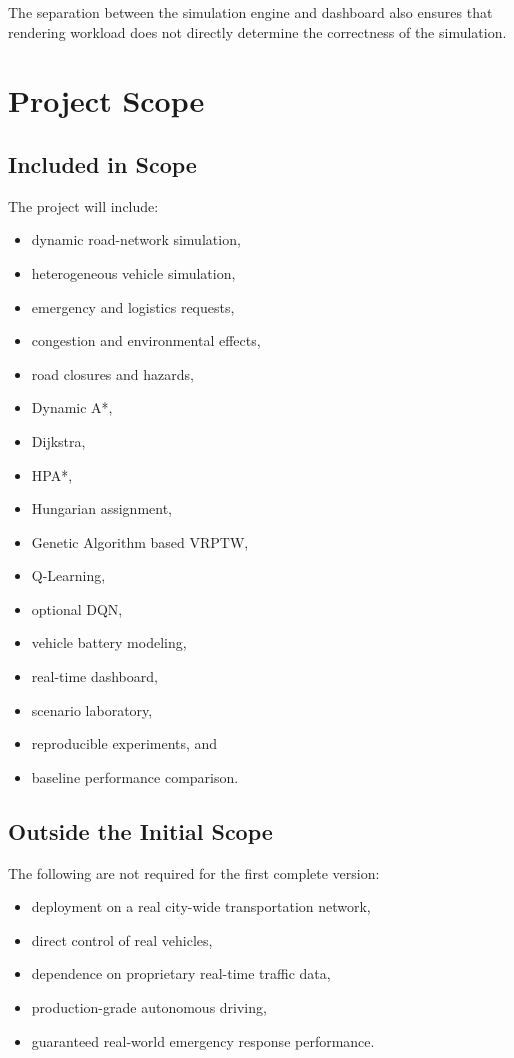 \documentclass[12pt,a4paper]{article}
\begin{document}
The separation between the simulation engine and dashboard also
ensures that rendering workload does not directly determine the
correctness of the simulation.





\section{Project Scope}

\subsection{Included in Scope}

The project will include:

\begin{itemize}
    \item dynamic road-network simulation,
    \item heterogeneous vehicle simulation,
    \item emergency and logistics requests,
    \item congestion and environmental effects,
    \item road closures and hazards,
    \item Dynamic A*,
    \item Dijkstra,
    \item HPA*,
    \item Hungarian assignment,
    \item Genetic Algorithm based VRPTW,
    \item Q-Learning,
    \item optional DQN,
    \item vehicle battery modeling,
    \item real-time dashboard,
    \item scenario laboratory,
    \item reproducible experiments, and
    \item baseline performance comparison.
\end{itemize}

\subsection{Outside the Initial Scope}

The following are not required for the first complete version:

\begin{itemize}
    \item deployment on a real city-wide transportation network,
    \item direct control of real vehicles,
    \item dependence on proprietary real-time traffic data,
    \item production-grade autonomous driving,
    \item guaranteed real-world emergency response performance.
\end{itemize}
\end{document}
